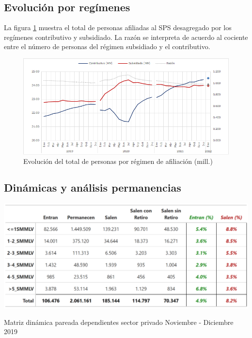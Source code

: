 \subsection{Evolución por regímenes}
La figura \ref{fig:anexo:regimenes} muestra el total de personas afiliadas al SPS desagregado por los regímenes contributivo y subsidiado. La razón se interpreta de acuerdo al cociente entre el número de personas del régimen subsidiado y el contributivo. 

\begin{figure}[!htbp]
    \centering
    \includegraphics[width = 13cm]{figures/anexo_tecnico/contributivo_subsidiado_regimenes.png}
    \caption{Evolución del total de personas por régimen de afiliación (mill.)}
    \label{fig:anexo:regimenes}
\end{figure}

\FloatBarrier
\subsection{Dinámicas y análisis permanencias}

\begin{table}[!h]
\label{tabla:sector_privado:matriz_dinamica_mes_12_2019}
\centering
\includegraphics[width = 15cm]{results/02_longitudinal/salida_resumen_dependientes_interes_19.png}
\caption{Matriz dinámica pareada dependientes sector privado Noviembre - Diciembre 2019}%
\end{table}

